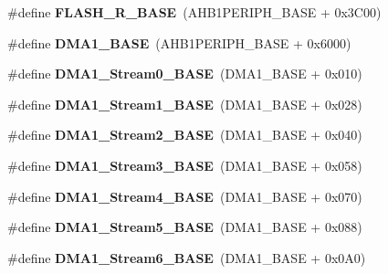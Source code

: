 \begin{DoxyCompactItemize}
\#define {\bfseries F\+L\+A\+S\+H\+\_\+\+R\+\_\+\+B\+A\+SE}~(A\+H\+B1\+P\+E\+R\+I\+P\+H\+\_\+\+B\+A\+SE + 0x3\+C00)
\item 
\mbox{\label{group___peripheral__memory__map_gab2d8a917a0e4ea99a22ac6ebf279bc72}} 
\#define {\bfseries D\+M\+A1\+\_\+\+B\+A\+SE}~(A\+H\+B1\+P\+E\+R\+I\+P\+H\+\_\+\+B\+A\+SE + 0x6000)
\item 
\mbox{\label{group___peripheral__memory__map_ga0d3c52aa35dcc68f78b704dfde57ba95}} 
\#define {\bfseries D\+M\+A1\+\_\+\+Stream0\+\_\+\+B\+A\+SE}~(D\+M\+A1\+\_\+\+B\+A\+SE + 0x010)
\item 
\mbox{\label{group___peripheral__memory__map_ga5b4152cef577e37eccc9311d8bdbf3c2}} 
\#define {\bfseries D\+M\+A1\+\_\+\+Stream1\+\_\+\+B\+A\+SE}~(D\+M\+A1\+\_\+\+B\+A\+SE + 0x028)
\item 
\mbox{\label{group___peripheral__memory__map_ga48a551ee91d3f07dd74347fdb35c703d}} 
\#define {\bfseries D\+M\+A1\+\_\+\+Stream2\+\_\+\+B\+A\+SE}~(D\+M\+A1\+\_\+\+B\+A\+SE + 0x040)
\item 
\mbox{\label{group___peripheral__memory__map_gac51deb54ff7cfe1290dfcf517ae67127}} 
\#define {\bfseries D\+M\+A1\+\_\+\+Stream3\+\_\+\+B\+A\+SE}~(D\+M\+A1\+\_\+\+B\+A\+SE + 0x058)
\item 
\mbox{\label{group___peripheral__memory__map_ga757a3c0d866c0fe68c6176156065a26b}} 
\#define {\bfseries D\+M\+A1\+\_\+\+Stream4\+\_\+\+B\+A\+SE}~(D\+M\+A1\+\_\+\+B\+A\+SE + 0x070)
\item 
\mbox{\label{group___peripheral__memory__map_ga0ded7bed8969fe2e2d616e7f90eb7654}} 
\#define {\bfseries D\+M\+A1\+\_\+\+Stream5\+\_\+\+B\+A\+SE}~(D\+M\+A1\+\_\+\+B\+A\+SE + 0x088)
\item 
\mbox{\label{group___peripheral__memory__map_ga58998ddc40adb6361704d6c9dad08125}} 
\#define {\bfseries D\+M\+A1\+\_\+\+Stream6\+\_\+\+B\+A\+SE}~(D\+M\+A1\+\_\+\+B\+A\+SE + 0x0\+A0)
\item 

\end{DoxyCompactItemize}
